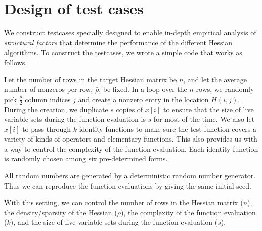 \documentclass[11pt, a4paper, english]{article}
\begin{document}
\section*{Design of test cases}

We construct testcases specially designed to enable in-depth empirical analysis of {\em structural factors} that determine the performance of the  different Hessian algorithms. 
To construct the testcases, we wrote a simple code that works as follows. 

Let the number of rows in the target Hessian matrix be $n$, and let the average number of nonzeros per row, $\bar{\rho}$, be fixed.
In a loop over the $n$ rows, we randomly pick $\frac{\bar{\rho}}{2}$ column indices $j$ and create a nonzero entry in the location $H(i,j)$. During the creation, we duplicate $s$ copies of $x[i]$ to ensure that the size of live variable sets during the function evaluation is $s$ for most of the time. We also let $x[i]$ to pass through $k$ identity functions to make sure the test function covers a variety of kinds of operators and elementary functions. This also provides us with a way to control the complexity of the function evaluation. Each identity function is randomly chosen among six pre-determined forms. 

All random numbers are generated by a deterministic random number generator. Thus we can reproduce the function evaluations by giving the same initial seed.

With this setting, we can control the number of rows in the Hessian matrix ($n$), the density/sparsity of the Hessian ($\rho$), the complexity of the function evaluation ($k$), and the size of live variable sets during the function evaluation ($s$).
\end{document}
